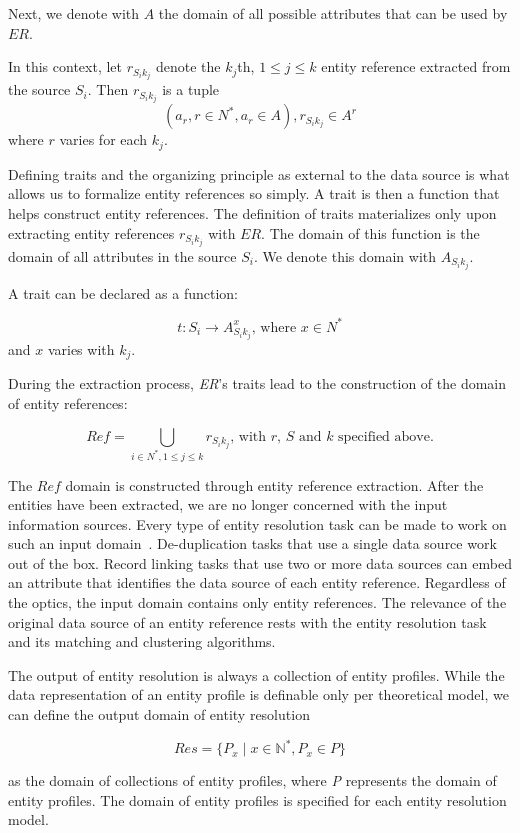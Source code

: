 Next, we denote with $A$ the domain of all possible attributes that can be
used by $ER$.

In this context, let $r_{{S_i}{k_j}}$ denote the $k_j$th, $1 \leq j \leq k$
entity reference extracted from the source $S_i$.
Then $r_{{S_i}{k_j}}$ is a tuple
\[
    (a_r, r \in N^*, a_r \in A), r_{{S_i}{k_j}} \in A^r
\]
where $r$ varies for each $k_j$.

Defining traits and the organizing principle as external to the data source
is what allows us to formalize entity references so simply.
A trait is then a function that helps construct entity references.
The definition of traits materializes only upon extracting entity references
$r_{{S_i}{k_j}}$ with $ER$.
The domain of this function is the domain of all attributes in the source
$S_i$.
We denote this domain with $A_{{S_i}{k_j}}$.

A trait can be declared as a function:

\[
    t: S_i \rightarrow A_{{S_i}{k_j}}^x\textrm{, where }x \in N^*
\]
and $x$ varies with $k_j$.

During the extraction process, \textit{ER}'s traits lead to the construction
of the domain of entity references:

\[
    Ref = \bigcup_{i \in N^*,1 \leq j \leq k} r_{{S_i}{k_j}}
    \textrm{, with } r \textrm{, }S \textrm{ and } k \textrm{ specified above.}
\]

The $Ref$ domain is constructed through entity reference extraction.
After the entities have been extracted, we are no longer concerned with the
input information sources.
Every type of entity resolution task can be made to work on such an input
domain~\cite{Pap19}.
De-duplication tasks that use a single data source work out of the box.
Record linking tasks that use two or more data sources can embed an
attribute that identifies the data source of each entity reference.
Regardless of the optics, the input domain contains only entity references.
The relevance of the original data source of an entity reference rests with
the entity resolution task and its matching and clustering algorithms.

The output of entity resolution is always a collection of entity profiles.
While the data representation of an entity profile is definable only per
theoretical model, we can define the output domain of entity resolution

\[
    Res=\{P_x \mid x \in \mathbb{N^*}, P_x \in P\}
\]

\noindent
as the domain of collections of entity profiles, where \textit{P} represents the
domain of entity profiles.
The domain of entity profiles is specified for each entity resolution model.

